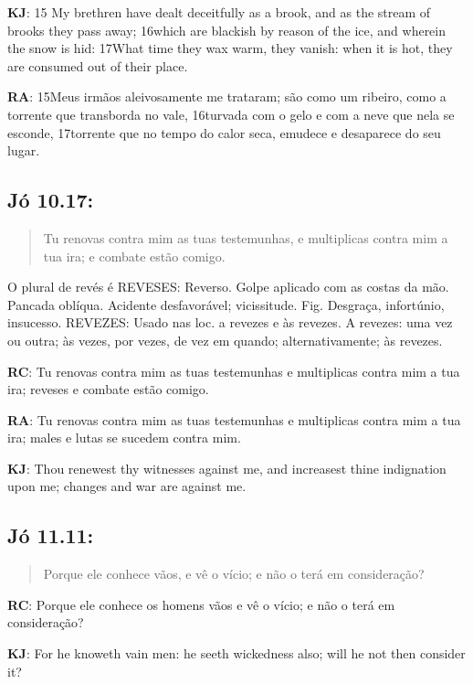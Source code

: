 \textbf{KJ}: 15 My brethren have dealt deceitfully as a brook, and as the stream of brooks they pass away; 16which are blackish by reason of the ice, and wherein the snow is hid: 17What time they wax warm, they vanish: when it is hot, they are consumed out of their place.

\textbf{RA}: 15Meus irmãos aleivosamente me trataram; são como um ribeiro, como a torrente que transborda no vale, 16turvada com o gelo e com a neve que nela se esconde, 17torrente que no tempo do calor seca, emudece e desaparece do seu lugar.

\subsection*{Jó 10.17:} 
 \begin{quote}
    \small
 Tu renovas contra mim as tuas testemunhas, e multiplicas contra mim a tua ira;  e combate estão comigo.
\end{quote}

O plural de revés é REVESES: Reverso. Golpe aplicado com as costas da mão. Pancada oblíqua. Acidente desfavorável; vicissitude. Fig. Desgraça, infortúnio, insucesso. REVEZES: Usado nas loc. a revezes e às revezes. A revezes: uma vez ou outra; às vezes, por vezes, de vez em quando; alternativamente; às revezes.

\textbf{RC}: Tu renovas contra mim as tuas testemunhas e multiplicas contra mim a tua ira; reveses e combate estão comigo.

\textbf{RA}: Tu renovas contra mim as tuas testemunhas e multiplicas contra mim a tua ira; males e lutas se sucedem contra mim.

\textbf{KJ}: Thou renewest thy witnesses against me, and increasest thine indignation upon me; changes and war are against me.

\subsection*{Jó 11.11:} 
 \begin{quote}
    \small
 Porque ele conhece  vãos, e vê o vício; e não o terá em consideração?
\end{quote}

\textbf{RC}: Porque ele conhece os homens vãos e vê o vício; e não o terá em consideração?

\textbf{KJ}: For he knoweth vain men: he seeth wickedness also; will he not then consider it?

